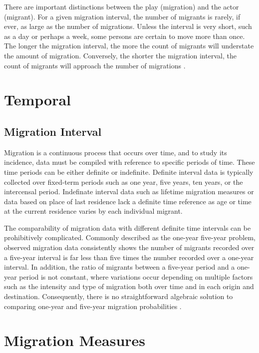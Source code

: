 \documentclass[
]{book}
\begin{document}
There are important distinctions between the play (migration) and the actor (migrant). For a given migration interval, the number of migrants is rarely, if ever, as large as the number of migrations. Unless the interval is very short, such as a day or perhaps a week, some persons are certain to move more than once. The longer the migration interval, the more the count of migrants will understate the amount of migration. Conversely, the shorter the migration interval, the count of migrants will approach the number of migrations \citet{Courgeau1979}.

\hypertarget{temporal}{%
\section{Temporal}\label{temporal}}

\hypertarget{migration-interval}{%
\subsection{Migration Interval}\label{migration-interval}}

Migration is a continuous process that occurs over time, and to study its incidence, data must be compiled with reference to specific periods of time. These time periods can be either definite or indefinite. Definite interval data is typically collected over fixed-term periods such as one year, five years, ten years, or the intercensal period. Indefinate interval data such as lifetime migration measures or data based on place of last residence lack a definite time reference as age or time at the current residence varies by each individual migrant.

The comparability of migration data with different definite time intervals can be prohibitively complicated. Commonly described as the one-year five-year problem, observed migration data consistently shows the number of migrants recorded over a five-year interval is far less than five times the number recorded over a one-year interval. In addition, the ratio of migrants between a five-year period and a one-year period is not constant, where variations occur depending on multiple factors such as the intensity and type of migration both over time and in each origin and destination. Consequently, there is no straightforward algebraic solution to comparing one-year and five-year migration probabilities \citet{Rogerson1990}.

\hypertarget{migration-measures}{%
\section{Migration Measures}\label{migration-measures}}
\end{document}
